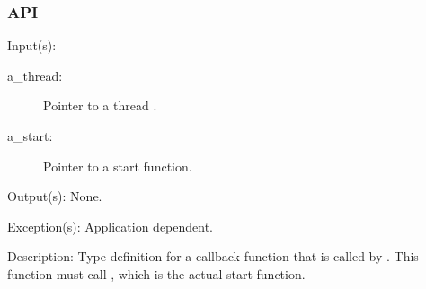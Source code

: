 \subsubsection{API}
\begin{capi}
\label{cw_thread_start_t}
	\begin{capilist}
	\item[Input(s): ]
		\begin{description}\item[]
		\item[a\_thread: ]
			Pointer to a thread .
		\item[a\_start: ]
			Pointer to a start function.
		\end{description}
	\item[Output(s): ] None.
	\item[Exception(s): ] Application dependent.
	\item[Description: ]
		Type definition for a callback function that is called by
		.  This function must call
		, which is the actual start function.


\end{capilist}
\end{capi}
